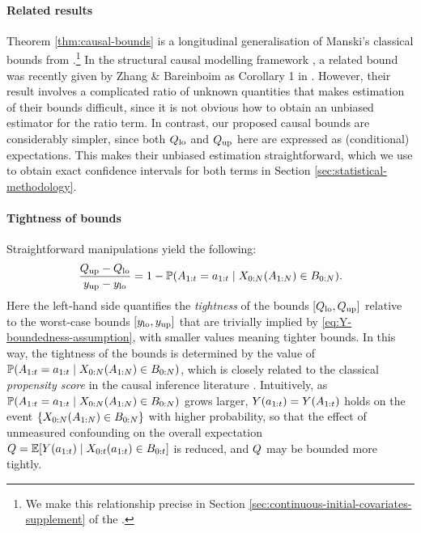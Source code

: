 \paragraph{Related results}
Theorem \ref{thm:causal-bounds} is a longitudinal generalisation of Manski's classical bounds from \cite{manski}.\footnote{We make this relationship precise in Section \ref{sec:continuous-initial-covariates-supplement} of the \AppendixName.}
In the structural causal modelling framework \cite{pearl2009causality}, a related bound was recently given by Zhang \& Bareinboim as Corollary 1 in \cite{bareinboim}.
However, their result involves a complicated ratio of unknown quantities that makes estimation of their bounds difficult, since it is not obvious how to obtain an unbiased estimator for the ratio term.
In contrast, our proposed causal bounds are considerably simpler, since both $Q_{\mathrm{lo}}$ and $Q_{\mathrm{up}}$ here are expressed as (conditional) expectations. 
This makes their unbiased estimation straightforward, which we use to obtain exact confidence intervals for both terms in Section \ref{sec:statistical-methodology}.

%

%
%



\paragraph{Tightness of bounds}

Straightforward manipulations yield the following:
\[
    \frac{Q_{\mathrm{up}} - Q_{\mathrm{lo}}}{y_{\mathrm{up}} - y_{\mathrm{lo}}} = 1 - \mathbb{P}(A_{1:t} = a_{1:t} \mid X_{0:N}(A_{1:N}) \in B_{0:N}).
\]
Here the left-hand side quantifies the \emph{tightness} of the bounds $[Q_{\mathrm{lo}}, Q_{\mathrm{up}}]$ relative to the worst-case bounds $[y_{\mathrm{lo}}, y_{\mathrm{up}}]$ that are trivially implied by \eqref{eq:Y-boundedness-assumption}, with smaller values meaning tighter bounds.
In this way, the tightness of the bounds is determined by the value of $\mathbb{P}(A_{1:t} = a_{1:t} \mid X_{0:N}(A_{1:N}) \in B_{0:N})$, which is closely related to the classical \emph{propensity score} in the causal inference literature \cite{rosenbaum1983central}. %
Intuitively, as $\mathbb{P}(A_{1:t} = a_{1:t} \mid X_{0:N}(A_{1:N}) \in B_{0:N})$ grows larger, $Y(a_{1:t}) = Y(A_{1:t})$ holds on the event $\{X_{0:N}(A_{1:N}) \in B_{0:N}\}$ with higher probability, so that the effect of unmeasured confounding on the overall expectation $Q = \mathbb{E}[Y(a_{1:t}) \mid X_{0:t}(a_{1:t}) \in B_{0:t}]$ is reduced, and  $Q$ may be bounded more tightly.
%

